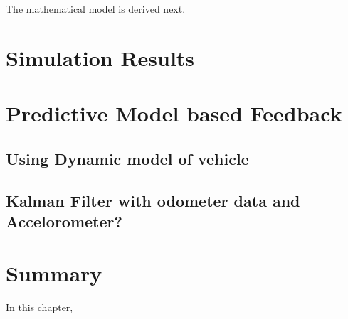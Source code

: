 The mathematical model is derived next.

\section{Simulation Results }
\section{Predictive Model based Feedback}
\subsection{Using Dynamic model of vehicle}
\subsection{Kalman Filter with odometer data and Accelorometer?}


\section{Summary}
In this chapter, 